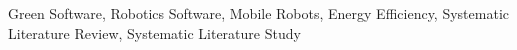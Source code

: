 \documentclass[10pt, conference, compsocconf]{IEEEtran}
\begin{document}
\begin{IEEEkeywords}
Green Software, Robotics Software, Mobile Robots, Energy Efficiency, Systematic Literature Review, Systematic Literature Study
\end{IEEEkeywords}



 


 





\end{document}
